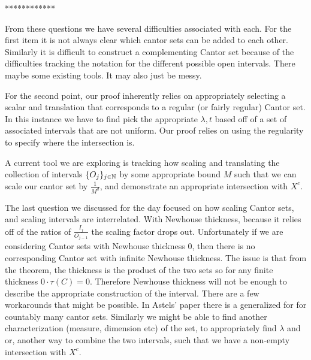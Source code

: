 ************

From these questions we have several difficulties associated with each.  For the first item it is not always clear which cantor sets can be added to each other.  Similarly it is difficult to construct a complementing Cantor set because of the difficulties tracking the notation for the different possible open intervals.  There maybe some existing tools. It may also just be messy. 

For the second point, our proof inherently relies on appropriately selecting a scalar and translation that corresponds to a regular (or fairly regular) Cantor set.  In this instance we have to find pick the appropriate $\lambda, t$ based off of a set of associated intervals that are not uniform.  Our proof relies on using the regularity to specify where the intersection is. 

A current tool we are exploring is tracking how scaling and translating the collection of intervals $\{O_j\}_{j \in \mathbb{N} }$ by some appropriate bound $M$ such that we can scale our cantor set by $\frac{1}{M^d}$, and demonstrate an appropriate intersection with $X^c$.  

The last question we discussed for the day focused on how scaling Cantor sets, and scaling intervals are interrelated.  With Newhouse thickness, because it relies off of the ratios of $\frac{I_j}{O_{j-1}}$ the scaling factor drops out.  Unfortunately if we are considering Cantor sets with Newhouse thickness $0$, then there is no corresponding Cantor set with infinite Newhouse thickness.  The issue is that from the theorem, the thickness is the product of the two sets so for any finite thickness $0\cdot \tau(C) = 0$.  Therefore Newhouse thickness will not be enough to describe the appropriate construction of the interval.  There are a few workarounds that might be possible.  In Astels' paper\cite{Astels} there is a generalized for for countably many cantor sets. Similarly we might be able to find another characterization (measure, dimension etc) of the set, to appropriately find $\lambda$ and or, another way to combine the two intervals, such that we have a non-empty intersection with $X^c$.  

